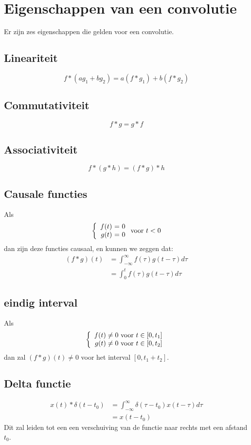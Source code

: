 \documentclass[]{subfiles}
\begin{document}
	\section{Eigenschappen van een convolutie}
	 Er zijn zes eigenschappen die gelden voor een convolutie.
	 \subsection{Lineariteit}
	 \begin{equation}
	 	f\ast (ag_1+bg_2)= a(f\ast g_1)  +b(f\ast g_2)
	 \end{equation}
 	\subsection{Commutativiteit}
 	\begin{equation}
 		f\ast g = g \ast f
 	\end{equation}
 \subsection{Associativiteit}
 \begin{equation}
 	f\ast (g\ast h) = (f\ast g) \ast h
 \end{equation}
\subsection{Causale functies}
Als
\begin{equation}
	\left\{ \begin{array}{r@{\text{ = }}l}
		f(t)& 0\\
		g(t)&0
	\end{array}\right.
	\text{voor } t<0
\end{equation}
dan zijn deze functies causaal, en kunnen we zeggen dat:
\begin{align*}
	(f\ast g) (t) &= \int_{-\infty}^{\infty} f(\tau)g(t-\tau)d\tau\\
	&= \int_{0}^{t}f(\tau)g(t-\tau)d\tau
\end{align*}
\subsection{eindig interval}
Als
\begin{equation}
	\left\{ \begin{array}{r@{\text{ voor }}l}
		f(t)\neq 0& t\in\left[ 0,t_1\right] \\
		g(t)\neq 0&t\in \left[ 0,t_2\right] 
	\end{array}\right.
\end{equation}
dan zal $(f\ast g)(t)\neq 0$ voor het interval $\left[0,t_1+t_2 \right] $.
\subsection{Delta functie}
\begin{align*}
	x(t)\ast \delta(t-t_0) &= \int_{-\infty}^{\infty}\delta(\tau-t_0)x(t-\tau)d\tau\\
	&=  x(t-t_0)
\end{align*}
Dit zal leiden tot een een verschuiving van de functie naar rechts met een afstand $t_0$.
\end{document}
